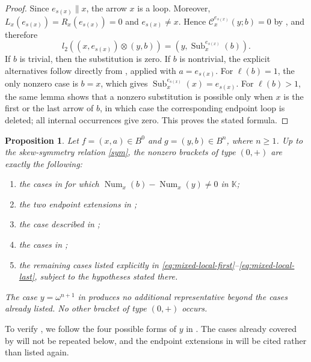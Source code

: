 \documentclass[11pt,a4paper,reqno]{amsart}
\newcommand{\mK}{\mathbb K}
\newcommand{\mC}{\mathcal C}
\newcommand{\Sub}{\operatorname{Sub}}
\newcommand{\para}[2]{(#1,#2)}
\newcommand{\num}[2]{\operatorname{Num}_{#1}(#2)}
\theoremstyle{plain}
\newtheorem{proposition}[proposition]{Proposition}
\theoremstyle{definition}
\numberwithin{equation}{section}
\begin{document}
	\begin{proof}
		Since $e_{s(x)}\parallel x$, the arrow $x$ is a loop.  Moreover,
		$L_x(e_{s(x)})=R_x(e_{s(x)})=0$
		and $e_{s(x)}\neq x$.  Hence
		$\mC_x^{e_{s(x)}}(y;b)=0$
		by , and therefore
		\[
		l_2(\para{x}{e_{s(x)}}\otimes\para{y}{b})
		=
		\para{y}{\Sub_x^{e_{s(x)}}(b)}.
		\]
		If $b$ is trivial, then the substitution is zero.  If $b$ is nontrivial,
		the explicit alternatives follow directly from
		, applied with $a=e_{s(x)}$.  For
		$\ell(b)=1$, the only nonzero case is $b=x$, which gives
		$\Sub_x^{e_{s(x)}}(x)=e_{s(x)}$.  For $\ell(b)>1$, the same lemma shows
		that a nonzero substitution is possible only when $x$ is the first or the
		last arrow of $b$, in which case the corresponding endpoint loop is deleted;
		all internal occurrences give zero.  This proves the stated formula.
	\end{proof}
	\begin{proposition}\label{prop:mixed-classification}
		Let $f=\para{x}{a}\in B^0$ and $g=\para{y}{b}\in B^n$, where $n\geq1$.
		Up to the skew-symmetry relation \eqref{sym}, the nonzero brackets of type
		$(0,+)$ are exactly the following:
		\begin{enumerate}
			\item the cases in  for which
			$\num{x}{b}-\num{x}{y}\neq0$ in $\mK$;
			\item the two endpoint extensions in
			;
			\item the case described in ;
			\item the cases in ;
			\item the remaining cases listed explicitly in
			\eqref{eq:mixed-local-first}--\eqref{eq:mixed-local-last}, subject to
			the hypotheses stated there.
		\end{enumerate}
		The case $y=\omega^{n+1}$ in  produces no
		additional representative beyond the cases already listed.  No other bracket
		of type $(0,+)$ occurs.
	\end{proposition}
	
	To verify , we follow the four possible forms
	of $y$ in .  The cases already covered by
	 will not be
	repeated below, and the endpoint extensions in
	 will be cited rather than listed
	again.
	
\end{document}
